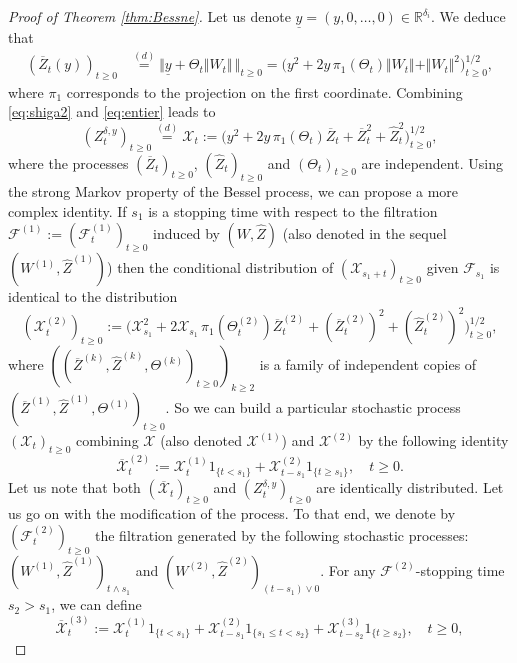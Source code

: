 \documentclass[12pt]{article}
\numberwithin{equation}{section}
\begin{document}
\begin{proof}[Proof of Theorem \ref{thm:Bessne}]
\noindent Let us denote $\underline{y}=(y,0,\ldots,0)\in\mathbb{R}^{\delta_i}$. We deduce that 
\begin{align}
(\overline{Z}_t(y))_{t\ge 0}&\overset{(d)}{=}\Big\Vert \underline{y}+\Theta_t\Vert W_t\Vert\,\Big\Vert_{t\ge 0}=\Big( y^2+2y\,\pi_1(\Theta_t)\Vert W_t\Vert+\Vert W_t\Vert^2 \Big)^{1/2}_{t\ge 0},
\label{eq:entier}
\end{align}
where $\pi_1$ corresponds to the projection on the first coordinate. Combining \eqref{eq:shiga2} and \eqref{eq:entier} leads to
\begin{equation}\label{eq:decomp}
(Z^{\delta,y}_t)_{t\ge 0}\overset{(d)}{=}\mathcal{X}_t:=\Big( y^2+2y\,\pi_1(\Theta_t)\overline{Z}_t +\overline{Z}_t^2 +\widehat{Z}_t^2 \Big)^{1/2}_{t\ge 0},
\end{equation}
where the processes $(\overline{Z}_t)_{t\ge 0}$, $(\widehat{Z}_t)_{t\ge 0}$ and $(\Theta_t)_{t\ge 0}$ are independent. Using the strong Markov property of the Bessel process, we can propose a more complex identity. If $s_1$ is a stopping time with respect to the filtration $\mathcal{F}^{(1)}:=(\mathcal{F}_t^{(1)})_{t\ge 0}$ induced by $(W,\widehat{Z})$  (also denoted in the sequel  $(W^{(1)},\widehat{Z}^{(1)})$) then the conditional distribution of $(\mathcal{X}_{s_1+t})_{t\ge 0}$ given $\mathcal{F}_{s_1}$ is identical to the distribution 
\[
(\mathcal{X}_t^{(2)})_{t\ge 0}:=\Big( \mathcal{X}_{s_1}^2+2\mathcal{X}_{s_1}\,\pi_1(\Theta_t^{(2)})\overline{Z}_t^{(2)} +(\overline{Z}_t^{(2)})^2 +(\widehat{Z}_t^{(2)})^2 \Big)^{1/2}_{t\ge 0},
\]
where $((\overline{Z}^{(k)},\widehat{Z}^{(k)},\Theta^{(k)})_{t\ge 0})_{k\ge 2}$ is a family of independent copies of $(\overline{Z}^{(1)},\widehat{Z}^{(1)},\Theta^{(1)})_{t\ge 0}$. So we can build a particular stochastic process $(\mathcal{X}_t)_{t\ge 0}$ combining $\mathcal{X}$ (also denoted $\mathcal{X}^{(1)}$) and $\mathcal{X}^{(2)}$ by the following identity
\[
\overline{\mathcal{X}}_t^{(2)}:=\mathcal{X}^{(1)}_t1_{\{t< s_1\}}+\mathcal{X}^{(2)}_{t-s_1}1_{\{t\ge s_1\}},\quad t\ge 0.
\]
Let us note that both $(\overline{\mathcal{X}}_t)_{t\ge 0}$ and $(Z^{\delta,y}_t)_{t\ge 0}$ are identically distributed. Let us go on with the modification of the process. To that end, we denote by $(\mathcal{F}_t^{(2)})_{t\ge 0}$ the filtration generated by the following stochastic processes: $(W^{(1)},\widehat{Z}^{(1)})_{t\wedge s_1}$ and $(W^{(2)},\widehat{Z}^{(2)})_{(t-s_1)\vee 0}$. For any $\mathcal{F}^{(2)}$-stopping time  $s_2>s_1$, we can define
\[
\overline{\mathcal{X}}_t^{(3)}:=\mathcal{X}^{(1)}_t1_{\{t< s_1\}}+\mathcal{X}^{(2)}_{t-s_1}1_{\{s_1\le t< s_2\}}+\mathcal{X}^{(3)}_{t-s_2}1_{\{t\ge  s_2\}},\quad t\ge 0,
\]
\end{proof}
\end{document}
